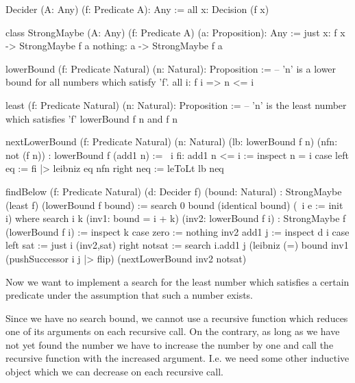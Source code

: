 \begin{alba}
    Decider (A: Any) (f: Predicate A): Any :=
        all x: Decision (f x)

    class StrongMaybe (A: Any) (f: Predicate A) (a: Proposition): Any :=
        just x: f x -> StrongMaybe f a
        nothing: a -> StrongMaybe f a

    lowerBound (f: Predicate Natural) (n: Natural): Proposition :=
            -- 'n' is a lower bound for all numbers which satisfy 'f'.
        all i: f i => n <= i

    least (f: Predicate Natural) (n: Natural): Proposition :=
            -- 'n' is the least number which satisfies 'f'
        lowerBound f n and f n

    nextLowerBound
        (f: Predicate Natural) (n: Natural)
        (lb: lowerBound f n) (nfn: not (f n))
        : lowerBound f (add1 n)
    :=
        \ i fi: add1 n <= i :=
            inspect n = i case
                left eq :=
                    fi |> leibniz eq nfn
                right neq :=
                    leToLt lb neq

    findBelow
        (f: Predicate Natural)
        (d: Decider f)
        (bound: Natural)
        : StrongMaybe (least f) (lowerBound f bound)
    :=
        search 0 bound (identical bound) (\ i e := init i)
        where
            search
                i k
                (inv1: bound = i + k)
                (inv2: lowerBound f i)
                : StrongMaybe f (lowerBound f i)
            :=
                inspect k case
                    zero :=
                        nothing inv2
                    add1 j :=
                        inspect d i case
                            left sat :=
                                just i (inv2,sat)
                            right notsat :=
                                search
                                    i.add1
                                    j
                                    (leibniz
                                        {(=) bound}
                                        inv1
                                        (pushSuccessor {i} {j} |> flip)
                                    (nextLowerBound inv2 notsat)
\end{alba}


Now we want to implement a search for the least number which satisfies a
certain predicate under the assumption that such a number exists.

Since we have no search bound, we cannot use a recursive function which reduces
one of its arguments on each recursive call. On the contrary, as long as we have
not yet found the number we have to increase the number by one and call the
recursive function with the increased argument. I.e. we need some other
inductive object which we can decrease on each recursive call.

